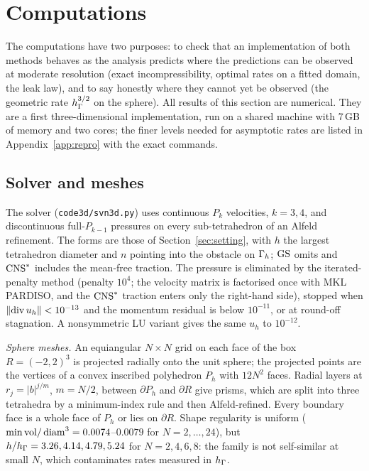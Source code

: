 \section{Computations}\label{sec:numerics}

The computations have two purposes: to check that an implementation of both methods behaves as the analysis predicts where the predictions can be observed at moderate resolution (exact incompressibility, optimal rates on a fitted domain, the leak law), and to say honestly where they cannot yet be observed (the geometric rate $h_\Gamma^{3/2}$ on the sphere). All results of this section are numerical. They are a first three-dimensional implementation, run on a shared machine with 7\,GB of memory and two cores; the finer levels needed for asymptotic rates are listed in Appendix~\ref{app:repro} with the exact commands.

\subsection{Solver and meshes}
The solver (\texttt{code3d/svn3d.py}) uses continuous $P_k$ velocities, $k=3,4$, and discontinuous full-$P_{k-1}$ pressures on every sub-tetrahedron of an Alfeld refinement. The forms are those of Section~\ref{sec:setting}, with $h$ the largest tetrahedron diameter and $n$ pointing into the obstacle on $\Gamma_h$; $\mathrm{GS}$ omits and $\mathrm{CNS}^\ast$ includes the mean-free traction. The pressure is eliminated by the iterated-penalty method (penalty $10^4$; the velocity matrix is factorised once with MKL PARDISO, and the $\mathrm{CNS}^\ast$ traction enters only the right-hand side), stopped when $\lVert \operatorname{div} u_h\rVert<10^{-13}$ and the momentum residual is below $10^{-11}$, or at round-off stagnation. A nonsymmetric LU variant gives the same $u_h$ to $10^{-12}$.

\emph{Sphere meshes.} An equiangular $N\times N$ grid on each face of the box $R=(-2,2)^3$ is projected radially onto the unit sphere; the projected points are the vertices of a convex inscribed polyhedron $P_h$ with $12N^2$ faces. Radial layers at $r_j=|b|^{j/m}$, $m=N/2$, between $\partial P_h$ and $\partial R$ give prisms, which are split into three tetrahedra by a minimum-index rule and then Alfeld-refined. Every boundary face is a whole face of $P_h$ or lies on $\partial R$. Shape regularity is uniform ($\min\text{vol}/\operatorname{diam}^3=0.0074$--$0.0079$ for $N=2,\dots,24$), but $h/h_\Gamma=3.26,4.14,4.79,5.24$ for $N=2,4,6,8$: the family is not self-similar at small $N$, which contaminates rates measured in $h_\Gamma$.

